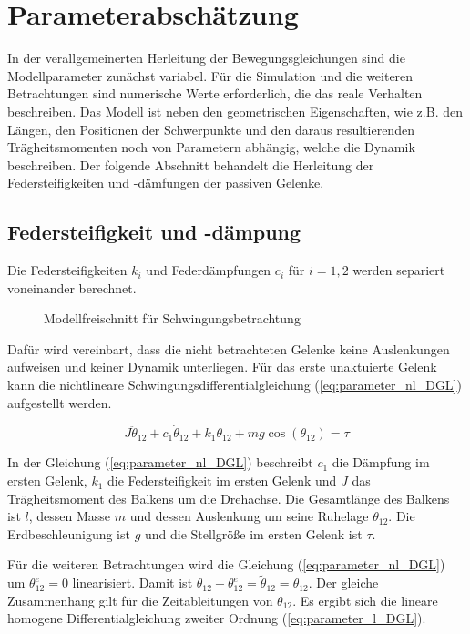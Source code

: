 \newpage
\chapter{Parameterabschätzung}

In der verallgemeinerten Herleitung der Bewegungsgleichungen sind die Modellparameter zunächst variabel. Für die Simulation und die weiteren Betrachtungen sind numerische Werte erforderlich, die das reale Verhalten beschreiben. Das Modell ist neben den geometrischen Eigenschaften, wie z.B. den Längen, den Positionen der Schwerpunkte und den daraus resultierenden Trägheitsmomenten noch von Parametern abhängig, welche die Dynamik beschreiben. Der folgende Abschnitt behandelt die Herleitung der Federsteifigkeiten und -dämfungen der passiven Gelenke.

\section{Federsteifigkeit und -dämpung}
\label{abs:Federparameter}
Die Federsteifigkeiten $k_i$ und Federdämpfungen $c_i$ für $i=1,2$ werden separiert voneinander berechnet. 

\begin{figure}[h]
	\centering
	
	\caption[Modellparameter]{Modellfreischnitt für Schwingungsbetrachtung}
	\label{fig:parameter_abschaetung}
\end{figure}

Dafür wird vereinbart, dass die nicht betrachteten Gelenke keine Auslenkungen aufweisen und keiner Dynamik unterliegen. 
Für das erste unaktuierte Gelenk kann die nichtlineare Schwingungsdifferentialgleichung (\ref{eq:parameter_nl_DGL}) aufgestellt werden. 

\begin{equation} \label{eq:parameter_nl_DGL}
J\ddot{\theta}_{12}+c_1\dot{\theta}_{12}+k_1\theta_{12}+mg\cos(\theta_{12})=\tau
\end{equation}

In der Gleichung (\ref{eq:parameter_nl_DGL}) beschreibt $c_1$ die Dämpfung im ersten Gelenk, $k_1$ die Federsteifigkeit im ersten Gelenk und $J$ das Trägheitsmoment des Balkens um die Drehachse. Die Gesamtlänge des Balkens ist $l$, dessen Masse $m$ und dessen Auslenkung um seine Ruhelage $\theta_{12}$. Die Erdbeschleunigung ist $g$ und die Stellgröße im ersten Gelenk ist $\tau$.

Für die weiteren Betrachtungen wird die Gleichung (\ref{eq:parameter_nl_DGL}) um $\theta_{12}^e=0$ linearisiert. Damit ist $\theta_{12}-\theta_{12}^e=\tilde{\theta}_{12}=\theta_{12}$. Der gleiche Zusammenhang gilt für die Zeitableitungen von $\theta_{12}$. Es ergibt sich die lineare homogene Differentialgleichung zweiter Ordnung (\ref{eq:parameter_l_DGL}).

